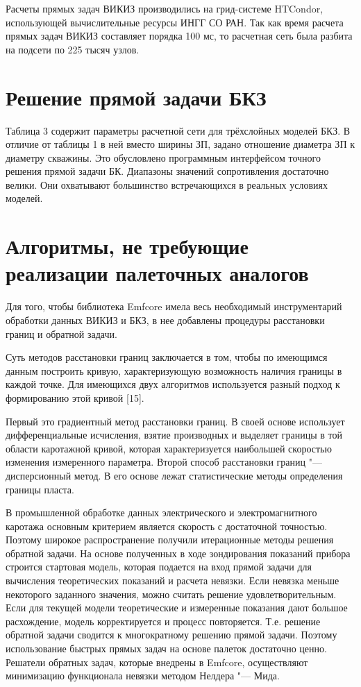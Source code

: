 Расчеты прямых задач ВИКИЗ производились на грид-системе HTCondor,
использующей вычислительные ресурсы ИНГГ СО РАН. Так как время расчета
прямых задач ВИКИЗ составляет порядка 100 мс, то расчетная сеть была
разбита на подсети по 225 тысяч узлов.

\section{Решение прямой задачи БКЗ}
Таблица 3 содержит параметры расчетной сети для трёхслойных моделей БКЗ. В
отличие от таблицы 1 в ней вместо ширины ЗП, задано отношение диаметра ЗП к
диаметру скважины. Это обусловлено программным интерфейсом точного решения
прямой задачи БК. Диапазоны значений сопротивления достаточно велики. Они
охватывают большинство встречающихся в реальных условиях моделей.

\section{Алгоритмы, не требующие реализации палеточных аналогов}
Для того, чтобы библиотека Emfcore имела весь необходимый инструментарий
обработки данных ВИКИЗ и БКЗ, в нее добавлены процедуры расстановки границ
и обратной задачи.

Суть методов расстановки границ заключается в том, чтобы по имеющимся
данным построить кривую, характеризующую возможность наличия границы в
каждой точке. Для имеющихся двух алгоритмов используется разный подход к
формированию этой кривой [15].

Первый это градиентный метод расстановки границ. В своей основе использует
дифференциальные исчисления, взятие производных и выделяет границы в той
области каротажной кривой, которая характеризуется наибольшей скоростью
изменения измеренного параметра. Второй способ расстановки границ "---
дисперсионный метод. В его основе лежат статистические методы определения
границы пласта.

В промышленной обработке данных электрического и электромагнитного каротажа
основным критерием является скорость с достаточной точностью. Поэтому
широкое распространение получили итерационные методы решения обратной
задачи. На основе полученных в ходе зондирования показаний прибора строится
стартовая модель, которая подается на вход прямой задачи для вычисления
теоретических показаний и расчета невязки. Если невязка меньше некоторого
заданного значения, можно считать решение удовлетворительным. Если для
текущей модели теоретические и измеренные показания дают большое
расхождение, модель корректируется и процесс повторяется. Т.е. решение
обратной задачи сводится к многократному решению прямой задачи. Поэтому
использование быстрых прямых задач на основе палеток достаточно ценно.
Решатели обратных задач, которые внедрены в Emfcore, осуществляют
минимизацию функционала невязки методом Нелдера "--- Мида.

